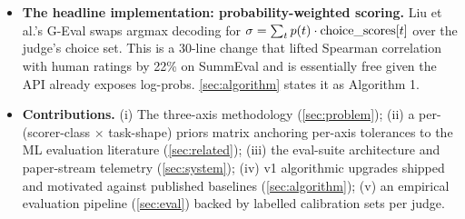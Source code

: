 \begin{itemize}[leftmargin=*]
        instruction-tuning / RLHF. The Overconfidence-in-LLM-as-a-Judge
        paper \cite{overconfidence2025} reproduced this on judge tasks
        directly: ECE 0.13--0.25 on instruction-tuned judges across
        pairwise and rubric judging. The implication is operational:
        every shipping eval-tool that defaults to instruction-tuned
        judges (Promptfoo, OpenAI Evals, Inspect, this work) is
        running on a configuration the calibration literature already
        documents as miscalibrated. Temperature scaling
        \cite{guo2017calibration} is the cheap fix; this paper makes
        the case for shipping it as default.
  \item \textbf{The headline implementation: probability-weighted
        scoring.} Liu et al.'s G-Eval \cite{liu2023geval} swaps argmax
        decoding for $\sigma = \sum_t p(t) \cdot \mathrm{choice\_scores}[t]$
        over the judge's choice set. This is a 30-line change that lifted
        Spearman correlation with human ratings by 22\% on SummEval and
        is essentially free given the API already exposes log-probs.
        \cref{sec:algorithm} states it as Algorithm 1.
  \item \textbf{Contributions.} (i) The three-axis methodology
        (\cref{sec:problem}); (ii) a per-(scorer-class $\times$
        task-shape) priors matrix anchoring per-axis tolerances to the
        ML evaluation literature (\cref{sec:related}); (iii) the
        eval-suite architecture and paper-stream telemetry
        (\cref{sec:system}); (iv) v1 algorithmic upgrades shipped
        and motivated against published baselines (\cref{sec:algorithm});
        (v) an empirical evaluation pipeline (\cref{sec:eval}) backed
        by labelled calibration sets per judge.
\end{itemize}
